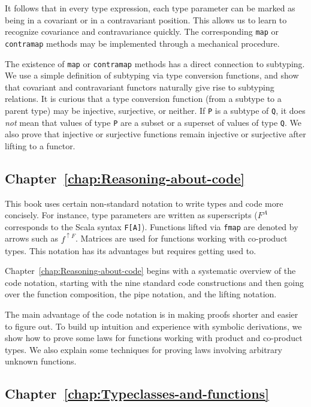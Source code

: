 It follows that in every type expression, each type parameter can
be marked as being in a covariant or in a contravariant position.
This allows us to learn to recognize covariance and contravariance
quickly. The corresponding \lstinline!map! or \lstinline!contramap!
methods may be implemented through a mechanical procedure.

The existence of \lstinline!map! or \lstinline!contramap! methods
has a direct connection to subtyping. We use a simple definition of
subtyping via type conversion functions, and show that covariant and
contravariant functors naturally give rise to subtyping relations.
It is curious that a type conversion function (from a subtype to a
parent type) may be injective, surjective, or neither. If \lstinline!P!
is a subtype of \lstinline!Q!, it does \emph{not} mean that values
of type \lstinline!P! are a subset or a superset of values of type
\lstinline!Q!. We also prove that injective or surjective functions
remain injective or surjective after lifting to a functor. 

\subsection{Chapter~\ref{chap:Reasoning-about-code}}

This book uses certain non-standard notation to write types and code
more concisely. For instance, type parameters are written as superscripts
($F^{A}$ corresponds to the Scala syntax \lstinline!F[A]!). Functions
lifted via \lstinline!fmap! are denoted by arrows such as $f^{\uparrow F}$.
Matrices are used for functions working with co-product types. This
notation has its advantages but requires getting used to.

Chapter~\ref{chap:Reasoning-about-code} begins with a systematic
overview of the code notation, starting with the nine standard code
constructions and then going over the function composition, the pipe
notation, and the lifting notation. 

The main advantage of the code notation is in making proofs shorter
and easier to figure out. To build up intuition and experience with
symbolic derivations, we show how to prove some laws for functions
working with product and co-product types. We also explain some techniques
for proving laws involving arbitrary unknown functions.

\subsection{Chapter~\ref{chap:Typeclasses-and-functions}}

